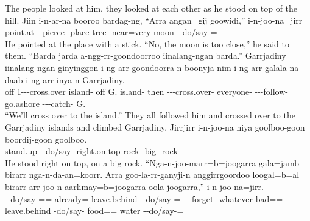 \begin{exye}
\ft The people looked at him, they looked at each other as he stood on top of the hill.
\newpage\exy {}
\gll Jiin i-n-ar-na booroo bardag-ng, ``Arra angan=gij goowidi,'' i-n-joo-na=jirr \\
point.at --pierce- place tree-  near=very moon --do/say-=\\
\ft He pointed at the place with a stick. ``No, the moon is too close,'' he said to them.
\exy {}
\gll ``Barda jarda a-ngg-rr-goondoorroo iinalang-ngan barda.'' Garrjadiny iinalang-ngan ginyinggon i-ng-arr-goondoorra-n boonyja-nim i-ng-arr-galala-na daab i-ng-arr-inya-n Garrjadiny.\\
off  1---cross.over island- off G. island- then ---cross.over- everyone- ---follow- go.ashore ---catch- G.\\
\ft ``We'll cross over to the island.'' They all followed him and crossed over to the Garrjadiny islands and climbed Garrjadiny.
\exy {}
\gll Jirrjirr i-n-joo-na niya goolboo-goon boordij-goon goolboo.\\
stand.up --do/say- right.on.top rock- big- rock\\
\ft He stood right on top, on a big rock.
\exy {}
\gll ``Nga-n-joo-marr=b=joogarra gala=jamb birarr nga-n-da-an=koorr. Arra goo-la-rr-ganyji-n anggirrgoordoo loogal=b=al birarr arr-joo-n aarlimay=b=joogarra oola joogarra,'' i-n-joo-na=jirr.\\
--do/say-== already= leave.behind --do/say-=  ---forget- whatever bad== leave.behind -do/say- food== water  --do/say-=\\

\end{exye}

